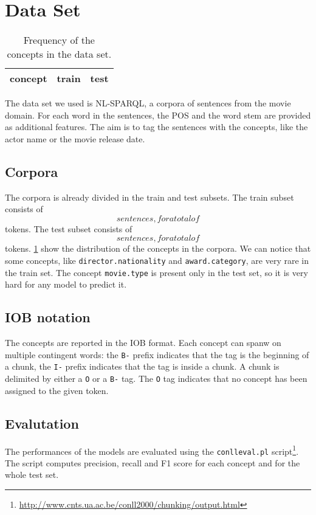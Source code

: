 \section{Data Set}
\label{sec:dataset}

\begin{table}[t!]
	\centering
    \begin{tabular}{ l l l }
    	\toprule
    		\multicolumn{1}{l}{concept} & \multicolumn{1}{l}{train} & \multicolumn{1}{c}{test} \\
    	\midrule
            
    	\bottomrule
	\end{tabular}
    \caption{Frequency of the concepts in the data set.}
	\label{tab:frequencies}
\end{table}

The data set we used is NL-SPARQL, a corpora of sentences from the movie domain.
For each word in the sentences, the \ac{POS} and the word stem are provided as additional features.
The aim is to tag the sentences with the concepts, like the actor name or the movie release date.

\subsection{Corpora}
The corpora is already divided in the train and test subsets.
The train subset consists of $$ sentences,
for a total of $$ tokens.
The test subset consists of $$ sentences,
for a total of $$ tokens.
\cref{tab:frequencies} show the distribution of the concepts in the corpora.
We can notice that some concepts, like \texttt{director.nationality} and \texttt{award.category},
are very rare in the train set.
The concept \texttt{movie.type} is present only in the test set, so it is very hard for any model to predict it.

\subsection{IOB notation}
The concepts are reported in the \ac{IOB} format.
Each concept can spanw on multiple contingent words:
the \texttt{B-} prefix indicates that the tag is the beginning of a chunk,
the \texttt{I-} prefix indicates that the tag is inside a chunk.
A chunk is delimited by either a \texttt{O} or a \texttt{B-} tag.
The \texttt{O} tag indicates that no concept has been assigned to the given token.

\subsection{Evalutation}
The performances of the models are evaluated using the \texttt{conlleval.pl}
script\footnote{\url{http://www.cnts.ua.ac.be/conll2000/chunking/output.html}}.
The script computes precision, recall and F1 score for each concept and for the whole test set.
